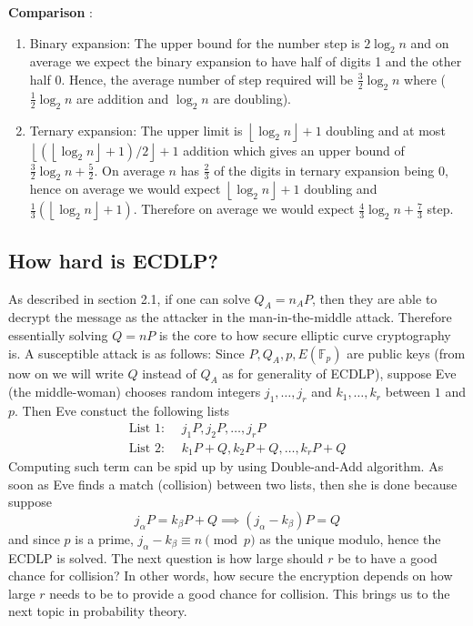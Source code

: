 \documentclass[a4 paper]{article}
\newcommand{\?}{\stackrel{?}{=}}
\begin{document}
\begin{note}{\bcicosaedre}
\textbf{Comparison} : 
\begin{enumerate}
    \item Binary expansion: The upper bound for the number step is $ \boxed{2 \log_2 n} $ and on average we expect the binary expansion to have half of digits 1 and the other half 0. Hence, the average number of step required will be $ \boxed{\frac{3}{2} \log_2 n} $ where ( $ \frac{1}{2} \log_2 n $ are addition and $ \log_2 n $ are doubling). 
    \item Ternary expansion: The upper limit is $ \left\lfloor \log_2 n  \right\rfloor  +1 $ doubling and at most $ \left\lfloor (\left\lfloor \log_2 n  \right\rfloor  + 1 ) / 2 \right\rfloor + 1   $ addition which gives an upper bound of $ \boxed{\frac{3}{2} \log_2 n + \frac{5}{2}} $. On average $ n $ has $ \frac{2}{3} $ of the digits in ternary expansion being 0, hence on average we would expect $ \left\lfloor \log_2n \right\rfloor + 1  $ doubling and $ \frac{1}{3} (\left\lfloor \log_2 n \right\rfloor + 1 ) $. Therefore on average we would expect $ \boxed{\frac{4}{3} \log_2 n + \frac{7}{3}} $ step. 
\end{enumerate}

\end{note}

\subsection{How hard is ECDLP?}
As described in section 2.1, if one can solve $ Q_A = n_A P $, then they are able to decrypt the message as the attacker in the man-in-the-middle attack. Therefore essentially solving $ Q = n P $ is the core to how secure elliptic curve cryptography is. A susceptible attack is as follows: Since $ P , Q_A, p, E(\mathbb{F}_p)$ are public keys (from now on we will write $ Q $ instead of $ Q_A $ as for generality of ECDLP), suppose Eve (the middle-woman) chooses random integers $ j_1 , \dots, j_r $ and $ k_1 , \dots,k_r $ between $ 1  $ and $ p $. Then Eve constuct the following lists 
\begin{align*}
    \text{List 1} : &\;\; j_1 P , j_2 P ,\dots, j_r P \\ 
    \text{List 2}  :  & \;\;k_1 P + Q, k_2 P + Q, \dots, k_rP +Q 
\end{align*}
Computing such term can be spid up by using Double-and-Add algorithm. As soon as Eve finds a match (collision) between two lists, then she is done because suppose 
$$ j_\alpha P = k_\beta P +Q \implies (j_\alpha - k_\beta) P = Q $$
and since $ p $ is a prime, $ j_\alpha - k_\beta  \equiv n \pmod p  $ as the unique modulo, hence the ECDLP is solved. The next question is how large should $ r $ be to have a good chance for collision? In other words, how secure the encryption depends on how large $ r $ needs to be to provide a good chance for collision. This brings us to the next topic in probability theory. 
\end{document}
